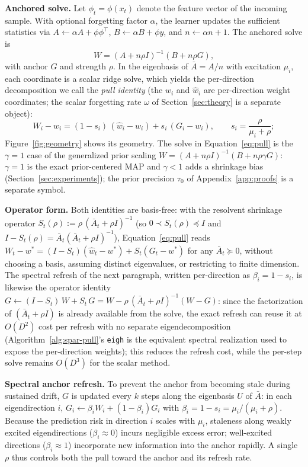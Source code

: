 \documentclass[10pt]{article}
\begin{document}
\textbf{Anchored solve.}
\label{sec:method-solve}
Let $\phi_t = \phi(x_t)$ denote the feature vector of the incoming sample.
With optional forgetting factor $\alpha$, the learner updates the sufficient statistics via $A \leftarrow \alpha A + \phi\phi^\top$, $B \leftarrow \alpha B + \phi y$, and $n \leftarrow \alpha n + 1$.
The anchored solve is
\[
  W = (A + n\rho I)^{-1}(B + n\rho G),
\]
with anchor $G$ and strength $\rho$.
In the eigenbasis of $\bar A = A/n$ with excitation $\mu_i$, each coordinate is a scalar ridge solve, which yields the per-direction decomposition we call the \emph{pull identity} (the $w_i$ and $\widehat w_i$ are per-direction weight coordinates; the scalar forgetting rate $\omega$ of Section~\ref{sec:theory} is a separate object):
\begin{equation}
\label{eq:pull}
  W_i - w_i = (1-s_i)\,(\widehat w_i - w_i) + s_i\,(G_i - w_i),
  \qquad s_i = \frac{\rho}{\mu_i + \rho};
\end{equation}
Figure~\ref{fig:geometry} shows its geometry.
The solve in Equation~\eqref{eq:pull} is the $\gamma = 1$ case of the generalized prior scaling $W = (A + n\rho I)^{-1}(B + n\rho\gamma G)$: $\gamma = 1$ is the exact prior-centered MAP and $\gamma < 1$ adds a shrinkage bias (Section~\ref{sec:experiments}); the prior precision $\tau_0$ of Appendix~\ref{app:proofs} is a separate symbol.

\textbf{Operator form.}
Both identities are basis-free: with the resolvent shrinkage operator $S_t(\rho) := \rho\,(\bar A_t + \rho I)^{-1}$ (so $0 \prec S_t(\rho) \preceq I$ and $I - S_t(\rho) = \bar A_t(\bar A_t + \rho I)^{-1}$), Equation~\eqref{eq:pull} reads $W_t - w^* = (I - S_t) (\widehat w_t - w^*) + S_t (G_t - w^*)$ for any $\bar A_t \succeq 0$, without choosing a basis, assuming distinct eigenvalues, or restricting to finite dimension.
The spectral refresh of the next paragraph, written per-direction as $\beta_i = 1 - s_i$, is likewise the operator identity $G \leftarrow (I - S_t)\,W + S_t\,G = W - \rho\,(\bar A_t + \rho I)^{-1}(W - G)$: since the factorization of $(\bar A_t + \rho I)$ is already available from the solve, the exact refresh can reuse it at $O(D^2)$ cost per refresh with no separate eigendecomposition (Algorithm~\ref{alg:spar-pull}'s \texttt{eigh} is the equivalent spectral realization used to expose the per-direction weights); this reduces the refresh cost, while the per-step solve remains $O(D^3)$ for the scalar method.

\textbf{Spectral anchor refresh.}
To prevent the anchor from becoming stale during sustained drift, $G$ is updated every $k$ steps along the eigenbasis $U$ of $\bar A$: in each eigendirection $i$, $G_{i} \leftarrow \beta_i W_{i} + (1-\beta_i) G_{i}$ with $\beta_i = 1 - s_i = \mu_i/(\mu_i + \rho)$.
Because the prediction risk in direction $i$ scales with $\mu_i$, staleness along weakly excited eigendirections ($\beta_i \approx 0$) incurs negligible excess error; well-excited directions ($\beta_i \approx 1$) incorporate new information into the anchor rapidly.
A single $\rho$ thus controls both the pull toward the anchor and its refresh rate.
\end{document}
